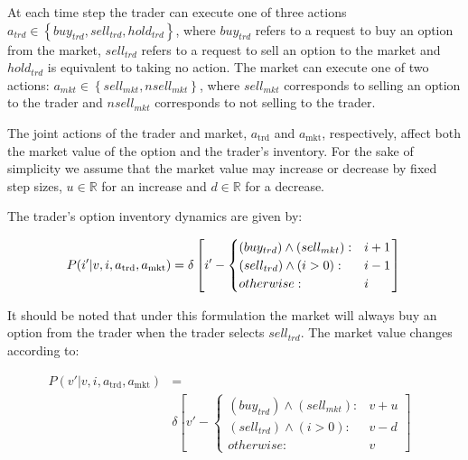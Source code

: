 At each time step the trader can execute one of three actions
$a_{trd} \in \left\{buy_{trd}, sell_{trd}, hold_{trd}\right\}$, where $buy_{trd}$ refers to a request to 
buy an option from the market, $sell_{trd}$ refers to a request to sell an option to
the market and $hold_{trd}$ is equivalent to taking no action. 
The market can execute one of two actions: $a_{mkt} \in \left\{sell_{mkt}, nsell_{mkt} \right\}$,
where $sell_{mkt}$ corresponds to selling an option to the trader and $nsell_{mkt}$ 
corresponds to not selling to the trader. 

The joint actions of the trader and market, $a_{\text{trd}}$ and 
$a_{\text{mkt}}$, respectively, affect both the market value of the option
and the trader's inventory. For the sake of simplicity we assume that
the market value may increase or decrease by fixed step sizes, 
$u \in \mathbb{R}$ for an increase and $d \in \mathbb{R}$ for a decrease.

The trader's option inventory dynamics are given by:

{\small 
\abovedisplayshortskip=0pt
\belowdisplayshortskip=0pt
\begin{equation*}
P(i' | v, i, a_{\text{trd}}, a_{\text{mkt}}) = \delta \left[ i' - \begin{cases}
      (buy_{trd}) \wedge (sell_{mkt}) : & i + 1 \\ 
      (sell_{trd}) \wedge (i > 0) : & i - 1 \\
      otherwise: & i \\
    \end{cases} \right] \\
\end{equation*}
}%

It should be noted that under this formulation the market will always
buy an option from the trader when the trader selects $sell_{trd}$. 
The market value changes according to:

{\small 
\abovedisplayskip=0pt
\belowdisplayskip=0pt
\begin{align*}
P(v' | v, i, a_{\text{trd}}, a_{\text{mkt}}) &= \\
&
\delta \left[ v' - \begin{cases}
      (buy_{trd}) \wedge (sell_{mkt})  : & v + u \\
       (sell_{trd}) \wedge (i > 0) : & v - d \\
      otherwise: & v
    \end{cases} \right] & \\    
\end{align*}
}%

